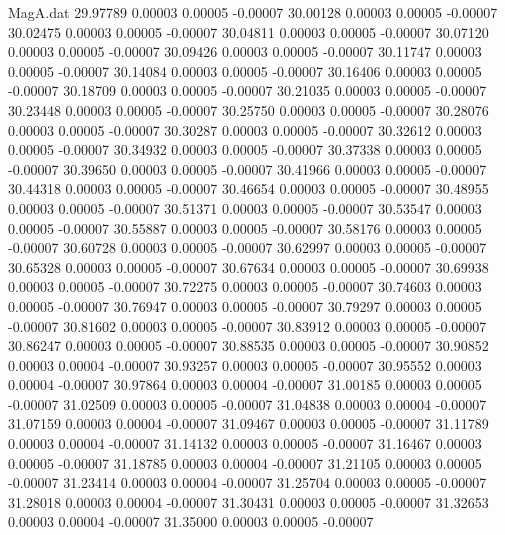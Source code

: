 \begin{filecontents}{MagA.dat}
  29.97789    0.00003    0.00005   -0.00007
  30.00128    0.00003    0.00005   -0.00007
  30.02475    0.00003    0.00005   -0.00007
  30.04811    0.00003    0.00005   -0.00007
  30.07120    0.00003    0.00005   -0.00007
  30.09426    0.00003    0.00005   -0.00007
  30.11747    0.00003    0.00005   -0.00007
  30.14084    0.00003    0.00005   -0.00007
  30.16406    0.00003    0.00005   -0.00007
  30.18709    0.00003    0.00005   -0.00007
  30.21035    0.00003    0.00005   -0.00007
  30.23448    0.00003    0.00005   -0.00007
  30.25750    0.00003    0.00005   -0.00007
  30.28076    0.00003    0.00005   -0.00007
  30.30287    0.00003    0.00005   -0.00007
  30.32612    0.00003    0.00005   -0.00007
  30.34932    0.00003    0.00005   -0.00007
  30.37338    0.00003    0.00005   -0.00007
  30.39650    0.00003    0.00005   -0.00007
  30.41966    0.00003    0.00005   -0.00007
  30.44318    0.00003    0.00005   -0.00007
  30.46654    0.00003    0.00005   -0.00007
  30.48955    0.00003    0.00005   -0.00007
  30.51371    0.00003    0.00005   -0.00007
  30.53547    0.00003    0.00005   -0.00007
  30.55887    0.00003    0.00005   -0.00007
  30.58176    0.00003    0.00005   -0.00007
  30.60728    0.00003    0.00005   -0.00007
  30.62997    0.00003    0.00005   -0.00007
  30.65328    0.00003    0.00005   -0.00007
  30.67634    0.00003    0.00005   -0.00007
  30.69938    0.00003    0.00005   -0.00007
  30.72275    0.00003    0.00005   -0.00007
  30.74603    0.00003    0.00005   -0.00007
  30.76947    0.00003    0.00005   -0.00007
  30.79297    0.00003    0.00005   -0.00007
  30.81602    0.00003    0.00005   -0.00007
  30.83912    0.00003    0.00005   -0.00007
  30.86247    0.00003    0.00005   -0.00007
  30.88535    0.00003    0.00005   -0.00007
  30.90852    0.00003    0.00004   -0.00007
  30.93257    0.00003    0.00005   -0.00007
  30.95552    0.00003    0.00004   -0.00007
  30.97864    0.00003    0.00004   -0.00007
  31.00185    0.00003    0.00005   -0.00007
  31.02509    0.00003    0.00005   -0.00007
  31.04838    0.00003    0.00004   -0.00007
  31.07159    0.00003    0.00004   -0.00007
  31.09467    0.00003    0.00005   -0.00007
  31.11789    0.00003    0.00004   -0.00007
  31.14132    0.00003    0.00005   -0.00007
  31.16467    0.00003    0.00005   -0.00007
  31.18785    0.00003    0.00004   -0.00007
  31.21105    0.00003    0.00005   -0.00007
  31.23414    0.00003    0.00004   -0.00007
  31.25704    0.00003    0.00005   -0.00007
  31.28018    0.00003    0.00004   -0.00007
  31.30431    0.00003    0.00005   -0.00007
  31.32653    0.00003    0.00004   -0.00007
  31.35000    0.00003    0.00005   -0.00007

\end{filecontents}
